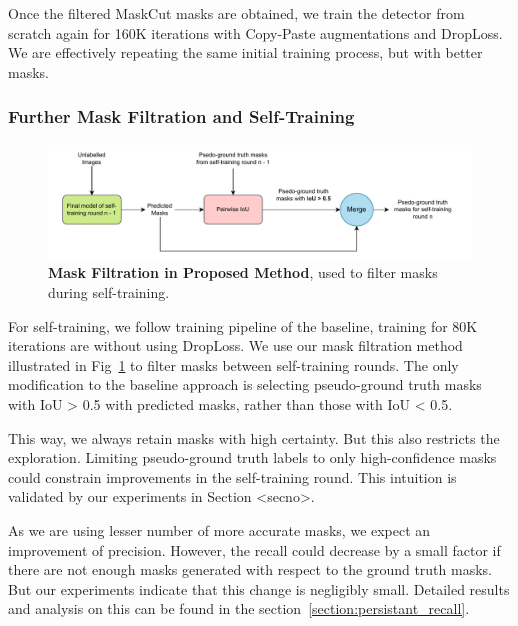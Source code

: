 Once the filtered MaskCut masks are obtained, we train the detector from scratch again for 160K iterations with Copy-Paste augmentations and DropLoss. We are effectively repeating the same initial training process, but with better masks.

\subsubsection{Further Mask Filtration and Self-Training}
\begin{figure}
	\centering
	\includegraphics[width=1\textwidth]{Images/main/our_filtration_self_training.pdf}
	\caption[\textbf{Mask Filtration in Proposed Method in Self-Training}]{\textbf{Mask Filtration in Proposed Method}, used to filter masks during self-training.}
	\label{fig:our_mask_filtration_self_training}
\end{figure}


 For self-training, we follow training pipeline of the baseline, training for 80K iterations are without using DropLoss. We use our mask filtration method illustrated in Fig~\ref{fig:our_mask_filtration_self_training} to filter masks between self-training rounds. The only modification to the baseline approach is selecting pseudo-ground truth masks with IoU > 0.5 with predicted masks, rather than those with IoU < 0.5. 
 
 This way, we always retain masks with high certainty. But this also restricts the exploration. Limiting pseudo-ground truth labels to only high-confidence masks could constrain improvements in the self-training round. This intuition is validated by our experiments in Section <secno>.
 
 As we are using lesser number of more accurate masks, we expect an improvement of precision. However, the recall could decrease by a small factor if there are not enough masks generated with respect to the ground truth masks. But our experiments indicate that this change is negligibly small. Detailed results and analysis on this can be found in the section~\ref{section:persistant_recall}.




